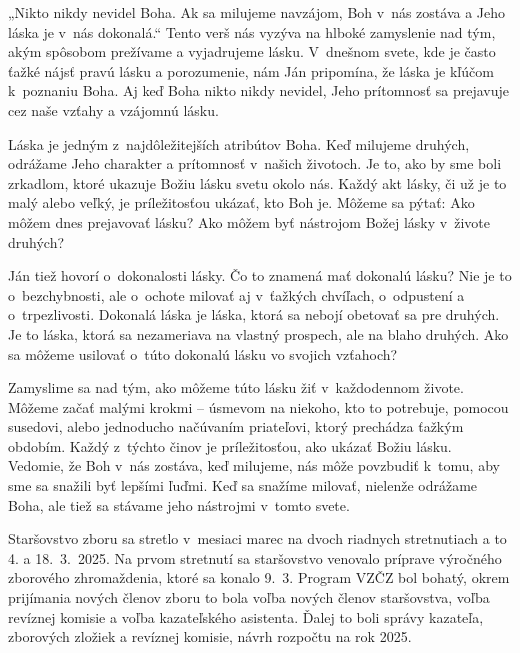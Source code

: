 \def\velkostpisma{9}
\def\velkostriadku{12}




„Nikto nikdy nevidel Boha. Ak sa milujeme navzájom, Boh v~nás zostáva a Jeho láska je v~nás dokonalá.“ Tento verš nás vyzýva na hlboké zamyslenie nad tým, akým spôsobom prežívame a vyjadrujeme lásku. V~dnešnom svete, kde je často ťažké nájsť pravú lásku a porozumenie, nám Ján pripomína, že láska je kľúčom k~poznaniu Boha. Aj keď Boha nikto nikdy nevidel, Jeho prítomnosť sa prejavuje cez naše vzťahy a vzájomnú lásku.

Láska je jedným z~najdôležitejších atribútov Boha. Keď milujeme druhých, odrážame Jeho charakter a prítomnosť v~našich životoch. Je to, ako by sme boli zrkadlom, ktoré ukazuje Božiu lásku svetu okolo nás. Každý akt lásky, či už je to malý alebo veľký, je príležitosťou ukázať, kto Boh je. Môžeme sa pýtať: Ako môžem dnes prejavovať lásku? Ako môžem byť nástrojom Božej lásky v~živote druhých?


Ján tiež hovorí o~dokonalosti lásky. Čo to znamená mať dokonalú lásku? Nie je to o~bezchybnosti, ale o~ochote milovať aj v~ťažkých chvíľach, o~odpustení a o~trpezlivosti. Dokonalá láska je láska, ktorá sa nebojí obetovať sa pre druhých. Je to láska, ktorá sa nezameriava na vlastný prospech, ale na blaho druhých. Ako sa môžeme usilovať o~túto dokonalú lásku vo svojich vzťahoch?


Zamyslime sa nad tým, ako môžeme túto lásku žiť v~každodennom živote. Môžeme začať malými krokmi -- úsmevom na niekoho, kto to potrebuje, pomocou susedovi, alebo jednoducho načúvaním priateľovi, ktorý prechádza ťažkým obdobím. Každý z~týchto činov je príležitosťou, ako ukázať Božiu lásku. Vedomie, že Boh v~nás zostáva, keď milujeme, nás môže povzbudiť k~tomu, aby sme sa snažili byť lepšími ľuďmi. Keď sa snažíme milovať, nielenže odrážame Boha, ale tiež sa stávame jeho nástrojmi v~tomto svete.



Staršovstvo zboru sa stretlo v~mesiaci marec na dvoch riadnych stretnutiach a to 4. a 18.~3.~2025.
Na prvom stretnutí sa staršovstvo venovalo príprave výročného zborového zhromaždenia, ktoré sa konalo 9.~3. Program VZČZ bol bohatý, okrem prijímania nových členov zboru to bola voľba nových členov staršovstva, voľba revíznej komisie a voľba kazateľského asistenta. Ďalej to boli správy kazateľa, zborových zložiek a revíznej komisie, návrh rozpočtu na rok 2025.

